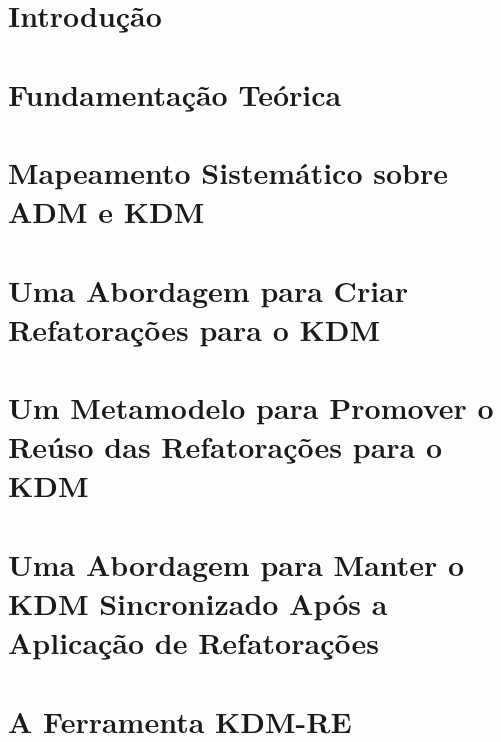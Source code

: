 \documentclass[doutorado, pre-defesa, spanish, english, brazil]{packages/icmc}
\begin{document}
\textual

\chapter{Introdução}
\label{chapter:introducao}


\chapter{Fundamentação Teórica}
\label{chapter:fundamentacao_teorica}


%

\chapter{Mapeamento Sistemático sobre ADM e KDM}\label{chapter:mapeamento_sistematico}


\chapter{Uma Abordagem para Criar Refatorações para o KDM}\label{chapter:catalogo_refactoring_KDM}


\chapter{Um Metamodelo para Promover o Reúso das Refatorações para o KDM}
\label{chapter:Toward_a_Refactoring_Metamodel_for_KDM}


\chapter{Uma Abordagem para Manter o KDM Sincronizado Após a Aplicação de Refatorações}\label{chapter:Abordagem_de_sincronizacao}


\chapter{A Ferramenta KDM-RE}\label{chapter:ferramenta_kdm_re}

\end{document}
